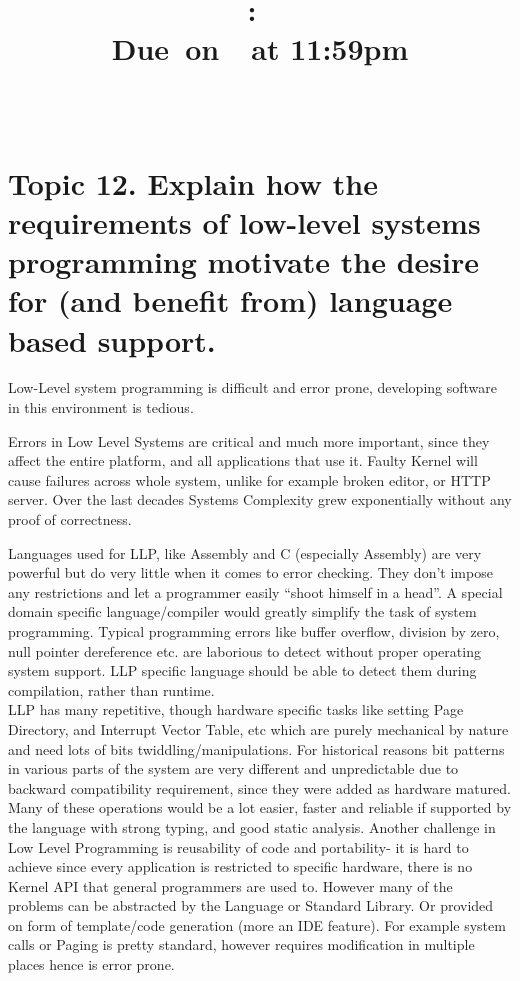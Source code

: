 \documentclass{article}
\title{
    \vspace{2in}
    \textmd{\textbf{\hmwkClass:\ \hmwkTitle}}\\
        \normalsize\vspace{0.1in}\small{Due\ on\ \hmwkDueDate\ at 11:59pm}\\
        \vspace{0.1in}\large{\textit{\hmwkClassInstructor\ \hmwkClassTime}}
    \vspace{3in}
}
\author{\textbf{\hmwkAuthorName}}
\date{}
\begin{document}
\maketitle

\pagebreak

        \section{Topic 12. Explain how the requirements of low-level systems programming motivate the desire
        for (and benefit from) language based support.}

        Low-Level system programming is difficult and error prone, developing software in this
        environment is tedious. 

        Errors in Low Level Systems are critical and much more important, since they affect the
        entire platform, and all applications that use it. Faulty Kernel will cause failures across
        whole system, unlike for example broken editor, or HTTP server. Over the last decades
        Systems Complexity grew exponentially without any proof of correctness.
        

        Languages used for LLP, like Assembly and C  (especially
        Assembly) are very powerful but do very little when it comes to error checking. They don't
        impose any restrictions and let a programmer easily ``shoot himself in a head''.
        A special domain specific language/compiler would greatly simplify the task of system programming.
        Typical programming errors like buffer overflow, division by zero, null pointer
        dereference etc. are laborious to detect without proper operating system support.
        LLP specific language should be able to detect them during compilation, rather than
        runtime.
        \\

        LLP has many repetitive, though hardware specific tasks like setting Page Directory,
        and Interrupt Vector Table, etc which are purely mechanical by nature and need lots of
        bits twiddling/manipulations. For historical reasons bit patterns in various parts of the system
        are very different and unpredictable due to backward compatibility requirement, since they
        were added as hardware matured. Many
        of these operations would be a lot easier, faster and reliable if supported by the
        language with strong typing, and good static analysis.
        Another challenge in Low Level Programming is reusability of code and portability- it is hard to
        achieve since every application is restricted  to specific hardware, there is no
        Kernel API that general programmers are used to. 
        However many of the problems can be abstracted by the Language or Standard Library. Or
        provided on form of template/code generation (more an IDE feature). For example system calls
        or Paging is pretty standard, however requires modification in multiple places hence is
        error prone.\\
\end{document}
